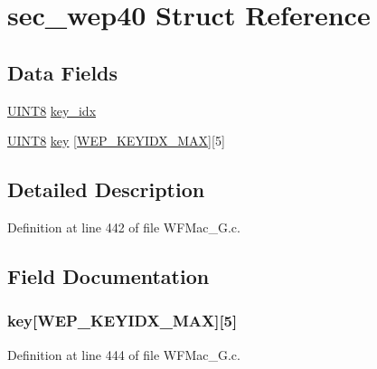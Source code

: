 \hypertarget{structsec__wep40}{}\section{sec\+\_\+wep40 Struct Reference}
\label{structsec__wep40}
\subsection*{Data Fields}
\begin{DoxyCompactItemize}
\item 
\hyperlink{_generic_type_defs_8h_ab27e9918b538ce9d8ca692479b375b6a}{U\+I\+N\+T8} \hyperlink{structsec__wep40_af9aac195765cf2f2eb0b857c99c96a74}{key\+\_\+idx}
\item 
\hyperlink{_generic_type_defs_8h_ab27e9918b538ce9d8ca692479b375b6a}{U\+I\+N\+T8} \hyperlink{structsec__wep40_ac76e3fc7177416ec01b772f819abb6ff}{key} \mbox{[}\hyperlink{_w_f_mac__24_g_8c_ac5b95f02723021833cc47477b06a962ca589c29c2ea5ff7dc0f68dbc2a417aef6}{W\+E\+P\+\_\+\+K\+E\+Y\+I\+D\+X\+\_\+\+M\+A\+X}\mbox{]}\mbox{[}5\mbox{]}
\end{DoxyCompactItemize}


\subsection{Detailed Description}


Definition at line 442 of file W\+F\+Mac\+\_\+G.\+c.



\subsection{Field Documentation}
\hypertarget{structsec__wep40_ac76e3fc7177416ec01b772f819abb6ff}{}
\subsubsection[{key}]{ key\mbox{[}{\bf W\+E\+P\+\_\+\+K\+E\+Y\+I\+D\+X\+\_\+\+M\+A\+X}\mbox{]}\mbox{[}5\mbox{]}}\label{structsec__wep40_ac76e3fc7177416ec01b772f819abb6ff}


Definition at line 444 of file W\+F\+Mac\+\_\+G.\+c.

\hypertarget{structsec__wep40_af9aac195765cf2f2eb0b857c99c96a74}{}

